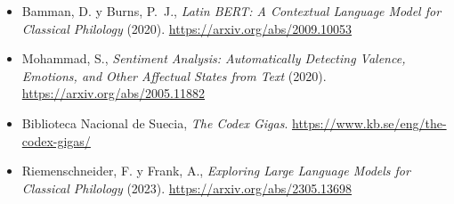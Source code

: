\documentclass[11pt]{article}
\begin{document}
\begin{itemize}
  \item Bamman, D. y Burns, P.~J., \emph{Latin BERT: A Contextual Language Model for Classical
        Philology} (2020). \url{https://arxiv.org/abs/2009.10053}
  \item Mohammad, S., \emph{Sentiment Analysis: Automatically Detecting Valence, Emotions, and
        Other Affectual States from Text} (2020). \url{https://arxiv.org/abs/2005.11882}
  \item Biblioteca Nacional de Suecia, \emph{The Codex Gigas}.
        \url{https://www.kb.se/eng/the-codex-gigas/}
  \item Riemenschneider, F. y Frank, A., \emph{Exploring Large Language Models for Classical
        Philology} (2023). \url{https://arxiv.org/abs/2305.13698}
\end{itemize}
\end{document}
